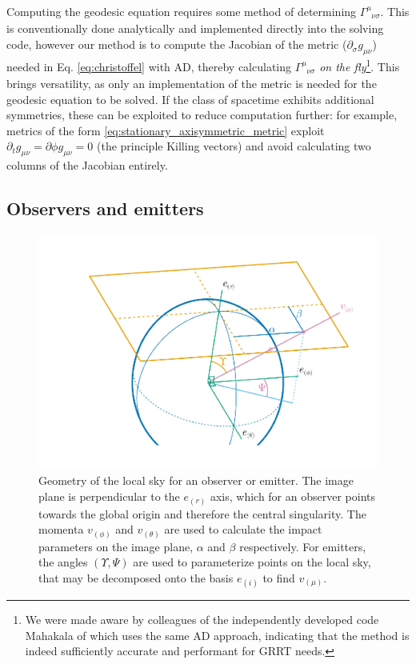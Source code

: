 \documentclass[fleqn,usenatbib]{mnras}
\newcommand{\utensor}[3]{#1^{#2}_{\phantom{#2}#3}}
\begin{document}
Computing the geodesic equation requires some method of determining
$\utensor{\Gamma}{\mu}{\nu\sigma}$. This is conventionally done analytically and
implemented directly into the solving code, however our method is to compute the
Jacobian of the metric ($\partial_{\sigma} g_{\mu \nu}$) needed in Eq.
\eqref{eq:christoffel} with AD, thereby calculating
$\utensor{\Gamma}{\mu}{\nu\sigma}$ \textit{on the fly}\footnote{We were made
    aware by colleagues of the independently developed code Mahakala of
    \citet{sharma_mahakala_2023} which uses the same AD approach, indicating
that the method is indeed sufficiently accurate and performant for GRRT needs.}.
This brings versatility, as only an implementation of the metric is needed for
the geodesic equation to be solved.  If the class of spacetime exhibits
additional symmetries, these can be exploited to reduce computation further: for
example, metrics of the form \eqref{eq:stationary_axisymmetric_metric} exploit
$\partial_t g_{\mu\nu} = \partial{\phi} g_{\mu\nu} = 0$ (the principle Killing
vectors) and avoid calculating two columns of the Jacobian entirely.

\subsection{Observers and emitters}
\label{sec:observers-and-emitters}

\begin{figure}
    \centering
    \includegraphics[width=0.99\linewidth]{figures/skycoords.pdf}
    \caption{
    Geometry of the local sky for an observer or emitter. The image plane is
    perpendicular to the $e_{(r)}$ axis, which for an observer points towards
    the global origin and therefore the central singularity. The momenta
    $v_{(\phi)}$ and $v_{(\theta)}$ are used to calculate the impact parameters
    on the image plane, $\alpha$ and $\beta$ respectively. For emitters, the
    angles $(\Upsilon, \Psi)$ are used to parameterize points on the local sky,
    that may be decomposed onto the basis $e_{(i)}$ to find $v_{(\mu)}$.
    }
    \label{fig:observer-coordinates}
\end{figure}
\end{document}
